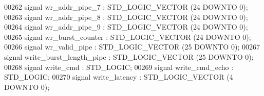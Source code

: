 \begin{DoxyCode}
00262                 \textcolor{keywordflow}{signal} \textcolor{vhdlchar}{wr_addr_pipe_7} \textcolor{vhdlchar}{:}  \textcolor{comment}{STD\_LOGIC\_VECTOR} \textcolor{vhdlchar}{(}\textcolor{vhdllogic}{}\textcolor{vhdllogic}{24} \textcolor{keywordflow}{DOWNTO} \textcolor{vhdllogic}{}\textcolor{vhdllogic}{0}\textcolor{vhdlchar}{)};
00263                 \textcolor{keywordflow}{signal} \textcolor{vhdlchar}{wr_addr_pipe_8} \textcolor{vhdlchar}{:}  \textcolor{comment}{STD\_LOGIC\_VECTOR} \textcolor{vhdlchar}{(}\textcolor{vhdllogic}{}\textcolor{vhdllogic}{24} \textcolor{keywordflow}{DOWNTO} \textcolor{vhdllogic}{}\textcolor{vhdllogic}{0}\textcolor{vhdlchar}{)};
00264                 \textcolor{keywordflow}{signal} \textcolor{vhdlchar}{wr_addr_pipe_9} \textcolor{vhdlchar}{:}  \textcolor{comment}{STD\_LOGIC\_VECTOR} \textcolor{vhdlchar}{(}\textcolor{vhdllogic}{}\textcolor{vhdllogic}{24} \textcolor{keywordflow}{DOWNTO} \textcolor{vhdllogic}{}\textcolor{vhdllogic}{0}\textcolor{vhdlchar}{)};
00265                 \textcolor{keywordflow}{signal} \textcolor{vhdlchar}{wr_burst_counter} \textcolor{vhdlchar}{:}  \textcolor{comment}{STD\_LOGIC\_VECTOR} \textcolor{vhdlchar}{(}\textcolor{vhdllogic}{}\textcolor{vhdllogic}{24} \textcolor{keywordflow}{DOWNTO} \textcolor{vhdllogic}{}\textcolor{vhdllogic}{0}\textcolor{vhdlchar}{)};
00266                 \textcolor{keywordflow}{signal} \textcolor{vhdlchar}{wr_valid_pipe} \textcolor{vhdlchar}{:}  \textcolor{comment}{STD\_LOGIC\_VECTOR} \textcolor{vhdlchar}{(}\textcolor{vhdllogic}{}\textcolor{vhdllogic}{25} \textcolor{keywordflow}{DOWNTO} \textcolor{vhdllogic}{}\textcolor{vhdllogic}{0}\textcolor{vhdlchar}{)};
00267                 \textcolor{keywordflow}{signal} \textcolor{vhdlchar}{write_burst_length_pipe} \textcolor{vhdlchar}{:}  \textcolor{comment}{STD\_LOGIC\_VECTOR} \textcolor{vhdlchar}{(}\textcolor{vhdllogic}{}\textcolor{vhdllogic}{25} \textcolor{keywordflow}{DOWNTO} \textcolor{vhdllogic}{}\textcolor{vhdllogic}{0}\textcolor{vhdlchar}{)};
00268                 \textcolor{keywordflow}{signal} \textcolor{vhdlchar}{write_cmd} \textcolor{vhdlchar}{:}  \textcolor{comment}{STD\_LOGIC};
00269                 \textcolor{keywordflow}{signal} \textcolor{vhdlchar}{write_cmd_echo} \textcolor{vhdlchar}{:}  \textcolor{comment}{STD\_LOGIC};
00270                 \textcolor{keywordflow}{signal} \textcolor{vhdlchar}{write_latency} \textcolor{vhdlchar}{:}  \textcolor{comment}{STD\_LOGIC\_VECTOR} \textcolor{vhdlchar}{(}\textcolor{vhdllogic}{}\textcolor{vhdllogic}{4} \textcolor{keywordflow}{DOWNTO} \textcolor{vhdllogic}{}\textcolor{vhdllogic}{0}\textcolor{vhdlchar}{)};

\end{DoxyCode}
